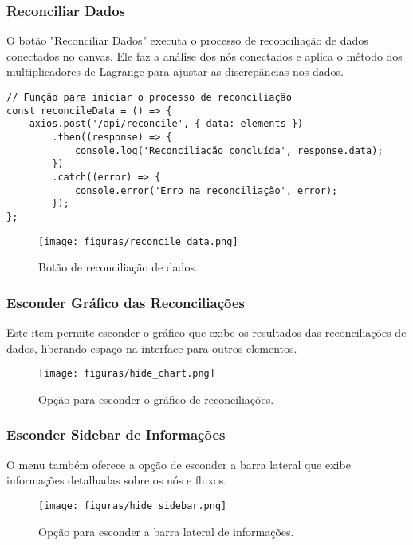 \subsubsection{Reconciliar Dados}

O botão "Reconciliar Dados" executa o processo de reconciliação de dados conectados no canvas. Ele faz a análise dos nós conectados e aplica o método dos multiplicadores de Lagrange para ajustar as discrepâncias nos dados.

\begin{verbatim}
// Função para iniciar o processo de reconciliação
const reconcileData = () => {
    axios.post('/api/reconcile', { data: elements })
        .then((response) => {
            console.log('Reconciliação concluída', response.data);
        })
        .catch((error) => {
            console.error('Erro na reconciliação', error);
        });
};
\end{verbatim}

\begin{figure}[htbp]
    \centering
    \texttt{[image: figuras/reconcile\_data.png]}
    \caption{Botão de reconciliação de dados.}
    \label{Fig:ReconcileData}
\end{figure}

\subsubsection{Esconder Gráfico das Reconciliações}

Este item permite esconder o gráfico que exibe os resultados das reconciliações de dados, liberando espaço na interface para outros elementos.

\begin{figure}[htbp]
    \centering
    \texttt{[image: figuras/hide\_chart.png]}
    \caption{Opção para esconder o gráfico de reconciliações.}
    \label{Fig:HideChart}
\end{figure}

\subsubsection{Esconder Sidebar de Informações}

O menu também oferece a opção de esconder a barra lateral que exibe informações detalhadas sobre os nós e fluxos.

\begin{figure}[htbp]
    \centering
    \texttt{[image: figuras/hide\_sidebar.png]}
    \caption{Opção para esconder a barra lateral de informações.}
    \label{Fig:HideSidebar}
\end{figure}

